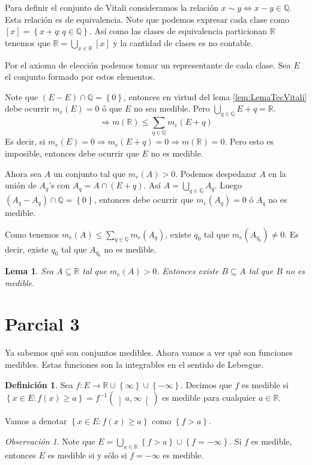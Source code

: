 \documentclass[12pt]{article}
\theoremstyle{plain}
\newtheorem{Lem}[Th]{Lema}             %
\theoremstyle{definition}
\newtheorem{Def}[Th]{Definición}       %
\theoremstyle{remark}
\newtheorem{Rmk}[Th]{Observación}      %
\numberwithin{equation}{section}
\newcommand{\bQ}{\mathbb{Q}}        %
\newcommand{\bR}{\mathbb{R}}        %
\renewcommand{\geq}{\geqslant}      %
\renewcommand{\leq}{\leqslant}      %
\renewcommand{\:}{\colon}           %
\newcommand{\conj}[1]{\left\lbrace#1\right\rbrace}
\newcommand{\bonj}[1]{\left\lbrack#1\right\rbrack}
\newcommand{\obonj}[1]{\left\rbrack#1\right\lbrack}
\begin{document}
\begin{multicols}{2}
Para definir el conjunto de Vitali consideramos la relación $x\sim y\iff x-y\in\bQ$. Esta relación es de equivalencia. Note que podemos expresar cada clase como $\bonj{x}=\conj{x+q\: q\in\bQ}$. Así como las clases de equivalencia particionan $\bR$ tenemos que $\bR=\bigcup_{x\in\bR}\bonj{x}$ y la cantidad de clases es no contable.\par
Por el axioma de elección podemos tomar un representante de cada clase. Sea $E$ el conjunto formado por estos elementos.\par
Note que $(E-E)\cap\bQ=\conj{0}$, entonces en virtud del lema \ref{lem:LemaTecVitali} debe ocurrir $m_e(E)=0$ ó que $E$ no sea medible. Pero $\bigcup_{q\in\bQ}E+q = \bR$.
$$\Rightarrow m(\bR)\leq\sum_{q\in\bQ}m_e(E+q)$$
Es decir, si $m_e(E)=0\Rightarrow m_e(E+q)=0\Rightarrow m(\bR)=0$. Pero esto es imposible, entonces debe ocurrir que $E$ no es medible.\par
Ahora sea $A$ un conjunto tal que $m_e(A)>0$. Podemos despedazar $A$ en la unión de $A_q$'s con $A_q=A\cap(E+q)$. Así $A=\bigcup_{q\in\bQ}A_q$. Luego $(A_q-A_q)\cap\bQ=\conj{0}$, entonces debe ocurrir que $m_e(A_q)=0$ ó $A_q$ no es medible.\par
Como tenemos $m_e(A)\leq\sum_{q\in\bQ}m_e(A_q)$, existe $q_0$ tal que $m_e(A_{q_0})\neq 0$. Es decir, existe $q_0$ tal que $A_{q_0}$ no es medible.

\begin{Lem}
  Sea $A\subseteq\bR$ tal que $m_e(A)>0$. Entonces existe $B\subseteq A$ tal que $B$ no es medible.
\end{Lem}

\section{Parcial 3}

Ya sabemos qué son conjuntos medibles. Ahora vamos a ver qué son funciones medibles. Estas funciones son la integrables en el sentido de Lebesgue.

\begin{Def}
  Sea $f\: E\to\bR\cup\conj{\infty}\cup\conj{-\infty}$. Decimos que $f$ es medible si $\conj{x\in E\: f(x)\geq a}=f^{-1}(\obonj{a,\infty})$ es medible para cualquier $a\in\bR$.
\end{Def}

Vamos a denotar $\conj{x\in E\: f(x)\geq a}$ como $\conj{f>a}$.
\begin{Rmk}
  Note que $E=\bigcup_{a\in\bR}\conj{f>a}\cup\conj{f=-\infty}$. Si $f$ es medible, entonces $E$ es medible si y sólo si ${f=-\infty}$ es medible.
\end{Rmk}


\end{multicols}
\end{document}
